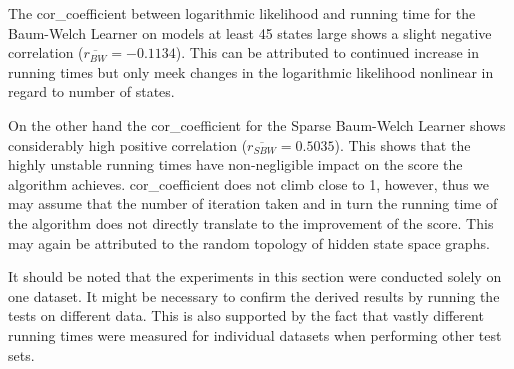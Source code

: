 The \gls{cor_coefficient} between logarithmic likelihood and running time for the Baum-Welch Learner on models at least 45 states large shows a slight negative correlation ($\overline{r_{BW}} = -0.1134$). This can be attributed to continued increase in running times but only meek changes in the logarithmic likelihood nonlinear in regard to number of states.

On the other hand the \gls{cor_coefficient} for the Sparse Baum-Welch Learner shows considerably high positive correlation ($\overline{r_{SBW}}=0.5035$). This shows that the highly unstable running times have non-negligible impact on the score the algorithm achieves. \gls{cor_coefficient} does not climb close to 1, however, thus we may assume that the number of iteration taken and in turn the running time of the algorithm does not directly translate to the improvement of the score. This may again be attributed to the random topology of hidden state space graphs.

It should be noted that the experiments in this section were conducted solely on one dataset. It might be necessary to confirm the derived results by running the tests on different data. This is also supported by the fact that vastly different running times were measured for individual datasets when performing other test sets.